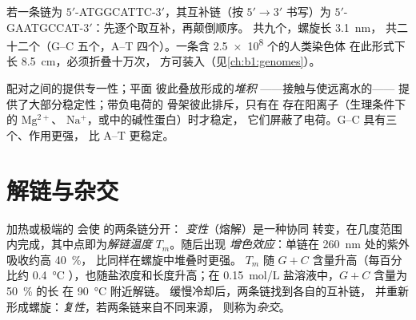\begin{example}[读取一条链]\label{ex:b1:nucleic-acids:complement}
若一条链为 $5'$-ATGGCATTC-$3'$，其互补链（按
$5' \to 3'$ 书写）为 $5'$-GAATGCCAT-$3'$：先逐个取互补，再颠倒顺序。
共九个，螺旋长 \qty{3.1}{nm}，
共二十二个（G--C 五个，A--T 四个）。一条含 \num{2.5e8} 个的人类染色体
在此形式下长 \qty{8.5}{cm}，必须折叠十万次，
方可装入（见\cref{ch:b1:genomes}）。
\end{example}

\begin{proposition}[维系双螺旋的因素]\label{prop:b1:nucleic-acids:stability}
配对之间的提供专一性；平面
彼此叠放形成的\emph{堆积}
——接触与使远离水的——
提供了大部分稳定性；带负电荷的
骨架彼此排斥，只有在
存在阳离子（生理条件下的 $\mathrm{Mg^{2+}}$、
$\mathrm{Na^+}$，或中的碱性蛋白）时才稳定，
它们屏蔽了电荷。G--C 具有三个、作用更强，
比 A--T 更稳定。
\end{proposition}

\section{解链与杂交}

\begin{definition}[变性，解链温度]\label{def:b1:nucleic-acids:melting}
加热或极端的  会使  的两条链分开：
\emph{变性}（熔解）是一种协同
转变，在几度范围内完成，其中点即为\emph{解链温度}
$T_m$。随后出现
\emph{增色效应}：单链在 \qty{260}{nm} 处的紫外吸收约高 \qty{40}{\%}，
比同样在螺旋中堆叠时更强。
$T_m$ 随 $G + C$ 含量升高（每百分比约 \qty{0.4}{\celsius}
），也随盐浓度和长度升高；在
\qty{0.15}{mol/L} 盐溶液中，$G + C$ 含量为 \qty{50}{\%} 的长  在 \qty{90}{\celsius} 附近解链。
缓慢冷却后，两条链找到各自的互补链，
并重新形成螺旋：\emph{复性}，若两条链来自不同来源，
则称为\emph{杂交}。
\end{definition}

